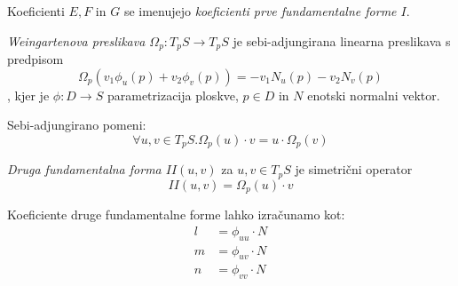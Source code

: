 \documentclass[mat1]{fmfdelo}
\begin{document}
Koeficienti $E, F \text{ in } G$ se imenujejo \emph{koeficienti prve fundamentalne forme $I$}.

\begin{definicija}
    \emph{Weingartenova preslikava $\Omega_p: T_p S \to T_p S$} je sebi-adjungirana linearna preslikava s predpisom
    $$ \Omega_p (v_1 \phi_u (p) + v_2 \phi_v (p)) = - v_1 N_u (p) - v_2 N_v (p) $$,
    kjer je $\phi : D \to S$ parametrizacija ploskve, $p \in D$ in $N$ enotski normalni vektor.
\end{definicija}

\begin{opomba}
    Sebi-adjungirano pomeni: $$ \forall u, v \in T_p S. \Omega_p (u) \cdot v = u \cdot \Omega_p (v) $$
\end{opomba}

\begin{definicija}
    \emph{Druga fundamentalna forma $II(u, v)$} za $u, v \in T_p S$ je simetrični operator $$II(u, v) = \Omega_p(u) \cdot v$$
\end{definicija}

\begin{lema}
    Koeficiente druge fundamentalne forme lahko izračunamo kot:
    \begin{align*}
        l &= \phi_{uu} \cdot N \\
        m &= \phi_{uv} \cdot N \\
        n &= \phi_{vv} \cdot N \\
    \end{align*}
\end{lema}
\end{document}
